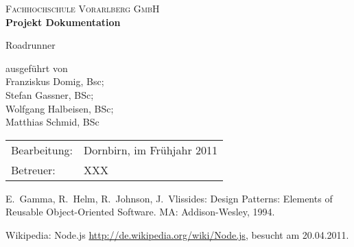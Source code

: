 \documentclass[11pt,a4paper]{article}
\begin{document}

\pagestyle{empty} %

\begin{center}
\textsc{Fachhochschule Vorarlberg GmbH}\\

\vspace{5cm}
{\large\textbf{Projekt Dokumentation}}\vspace{.5cm}

{\LARGE Roadrunner}

\vspace{10cm}
ausgeführt von\\
{\large
Franziskus Domig, Bsc;\\
Stefan Gassner, BSc;\\
Wolfgang Halbeisen, BSc;\\
Matthias Schmid, BSc}\\
\vfill

\end{center}

\begin{tabular}{ll}
Bearbeitung: & Dornbirn, im Frühjahr 2011\\
Betreuer: & XXX\\
\end{tabular}




\clearpage


\clearpage


\clearpage


\clearpage


\clearpage


\clearpage




\cleardoublepage

\begin{thebibliography}{99}

  E.\ Gamma, R.\ Helm, R.\ Johnson, J.\ Vlissides:
    Design Patterns: Elements of Reusable Object-Oriented Software.
	MA: Addison-Wesley, 1994.


\hspace{-\leftmargin}{\Large\bfseries Web-Referenzen} %

  Wikipedia: Node.js
    \url{http://de.wikipedia.org/wiki/Node.js}, besucht am 20.04.2011.

\end{thebibliography}


\fancyhead[R]{} %
\end{document}
